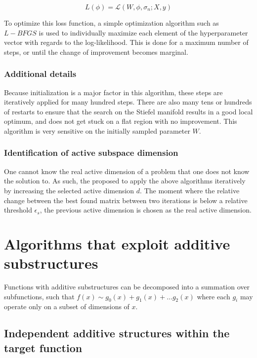 \begin{equation}
	L(\phi) = \mathcal{L}(W, \phi, \sigma_n; X, y) 
\end{equation}

To optimize this loss function, a simple optimization algorithm such as $L-BFGS$ is used to individually maximize each element of the hyperparameter vector with regards to the log-likelihood.
This is done for a maximum number of steps, or until the change of improvement becomes marginal. \\

\subsubsection{Additional details}
Because initialization is a major factor in this algorithm, these steps are iteratively applied for many hundred steps.
There are also many tens or hundreds of restarts to ensure that the search on the Stiefel manifold results in a good local optimum, and does not get stuck on a flat region with no improvement.
This algorithm is very sensitive on the initially sampled parameter $W$.

\subsubsection{Identification of active subspace dimension }
One cannot know the real active dimension of a problem that one does not know the solution to.
As such, the proposed to apply the above algorithms iteratively by increasing the selected active dimension $d$.
The moment where the relative change between the best found matrix between two iterations is below a relative threshold $\epsilon_s$, the previous active dimension is chosen as the real active dimension. 

\section{Algorithms that exploit additive substructures}

Functions with additive substructures can be decomposed into a summation over subfunctions, such that
$ f(x) \sim g_0(x) + g_1(x) + \ldots g_2(x) $ where each $g_i$ may operate only on a subset of dimensions of $x$.

\subsection{Independent additive structures within the target function}

